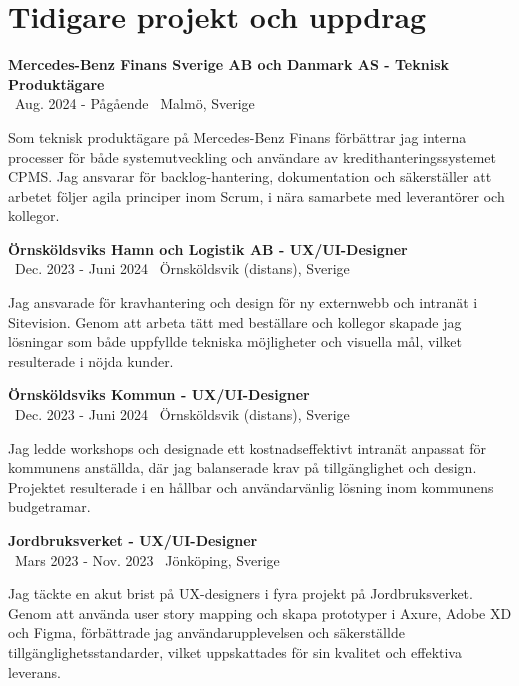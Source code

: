 \documentclass[a4paper,10pt]{article}
\begin{document}
\vspace{0.5cm}

\section*{Tidigare projekt och uppdrag}

\textbf{Mercedes-Benz Finans Sverige AB och Danmark AS - Teknisk Produktägare}\\
\normalsize \faCalendar \ Aug. 2024 - Pågående \quad \faMapMarker \ Malmö, Sverige

Som teknisk produktägare på Mercedes-Benz Finans förbättrar jag interna processer för både systemutveckling och användare av kredithanteringssystemet CPMS. Jag ansvarar för backlog-hantering, dokumentation och säkerställer att arbetet följer agila principer inom Scrum, i nära samarbete med leverantörer och kollegor.

\vspace{0.5cm}
\textbf{Örnsköldsviks Hamn och Logistik AB - UX/UI-Designer}\\
\normalsize \faCalendar \ Dec. 2023 - Juni 2024 \quad \faMapMarker \ Örnsköldsvik (distans), Sverige

Jag ansvarade för kravhantering och design för ny externwebb och intranät i Sitevision. Genom att arbeta tätt med beställare och kollegor skapade jag lösningar som både uppfyllde tekniska möjligheter och visuella mål, vilket resulterade i nöjda kunder.

\vspace{0.5cm}
\textbf{Örnsköldsviks Kommun - UX/UI-Designer}\\
\normalsize \faCalendar \ Dec. 2023 - Juni 2024 \quad \faMapMarker \ Örnsköldsvik (distans), Sverige

Jag ledde workshops och designade ett kostnadseffektivt intranät anpassat för kommunens anställda, där jag balanserade krav på tillgänglighet och design. Projektet resulterade i en hållbar och användarvänlig lösning inom kommunens budgetramar.

\vspace{0.5cm}
\textbf{Jordbruksverket - UX/UI-Designer}\\
\normalsize \faCalendar \ Mars 2023 - Nov. 2023 \quad \faMapMarker \ Jönköping, Sverige

Jag täckte en akut brist på UX-designers i fyra projekt på Jordbruksverket. Genom att använda user story mapping och skapa prototyper i Axure, Adobe XD och Figma, förbättrade jag användarupplevelsen och säkerställde tillgänglighetsstandarder, vilket uppskattades för sin kvalitet och effektiva leverans.
\end{document}
